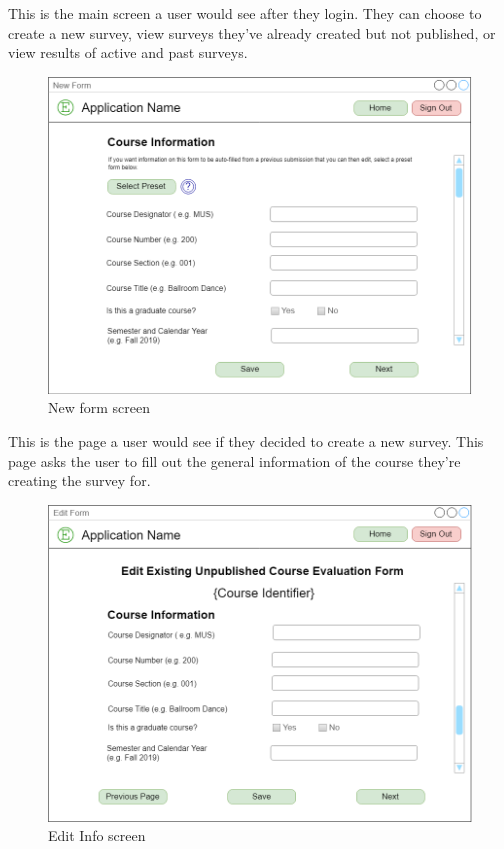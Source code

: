 \documentclass{article}
\begin{document}
This is the main screen a user would see after they login. They can choose to create a new survey, view surveys they've already created but not published, or view results of active and past surveys.

\begin{center}
\begin{figure}[H]
    \centering
    \caption{New form screen}
    \includegraphics[scale=.35]{images/create_screen.png}
\end{figure}
\end{center}

This is the page a user would see if they decided to create a new survey. This page asks the user to fill out the general information of the course they're creating the survey for.

\begin{center}
\begin{figure}[H]
    \centering
    \caption{Edit Info screen}
    \includegraphics[scale=.35]{images/edit_info_screen.png}
\end{figure}
\end{center}
\end{document}
